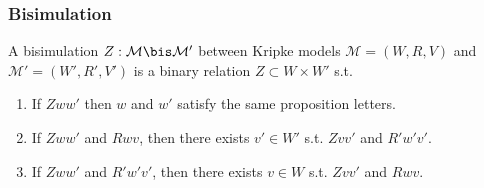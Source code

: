 \documentclass[UTF8,11pt,colorlinks,compress,openany]{beamer}%
\begin{document}
\begin{frame}\frametitle{Bisimulation}
	\begin{definition}[Bisimulation]
		A bisimulation $Z:\mathcal{M}\bis\mathcal{M}'$ between Kripke models $\mathcal{M}=(W,R,V)$ and $\mathcal{M}'=(W',R',V')$ is a binary relation $Z\subset W\times W'$ s.t.
		\begin{enumerate}
			\item If $Zww'$ then $w$ and $w'$ satisfy the same proposition letters.
			\item If $Zww'$ and $Rwv$, then there exists $v'\in W'$ s.t. $Zvv'$ and $R' w' v'$.
			\item If $Zww'$ and $R' w' v'$, then there exists $v\in W$ s.t. $Zvv'$ and $Rwv$.
		\end{enumerate}
	\end{definition}\vspace{-2ex}
\begin{center}
\end{center}
\end{frame}
\end{document}
